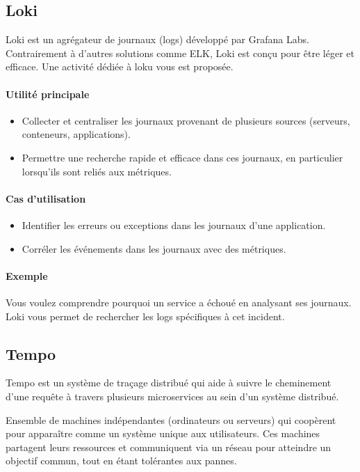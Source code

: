 \documentclass[french, 12pt]{article}%
\newcommand{\itemE}{\item[$\bullet$]}
\newcommand{\titreencadre}{Titre}
\newenvironment{encadre}[1]{\renewcommand{\titreencadre}{#1}
	\begin{mdframed}[style=encadrestyle]
	\vspace{0.5\baselineskip}
	}{%
	\end{mdframed}}
\begin{document}
\subsection{Loki}
Loki est un agrégateur de journaux (logs) développé par Grafana Labs. Contrairement à d'autres solutions comme ELK, Loki est conçu pour être léger et efficace. Une activité dédiée à loku vous est proposée.

\paragraph{Utilité principale}
\begin{itemize}
    \itemE Collecter et centraliser les journaux provenant de plusieurs sources (serveurs, conteneurs, applications).
    \itemE Permettre une recherche rapide et efficace dans ces journaux, en particulier lorsqu'ils sont reliés aux métriques.
\end{itemize}

\paragraph{Cas d'utilisation}
\begin{itemize}
    \itemE Identifier les erreurs ou exceptions dans les journaux d'une application.
    \itemE Corréler les événements dans les journaux avec des métriques.
\end{itemize}

\paragraph{Exemple}
Vous voulez comprendre pourquoi un service a échoué en analysant ses journaux. Loki vous permet de rechercher les logs spécifiques à cet incident.

\subsection{Tempo}
Tempo est un système de traçage distribué qui aide à suivre le cheminement d'une requête à travers plusieurs microservices au sein d'un système distribué.

\begin{encadre}{Système Distribué}
Ensemble de machines indépendantes (ordinateurs ou serveurs) qui coopèrent pour apparaître comme un système unique aux utilisateurs.  Ces machines partagent leurs ressources et communiquent via un réseau pour atteindre un objectif commun, tout en étant tolérantes aux pannes.
\end{encadre}
\end{document}
